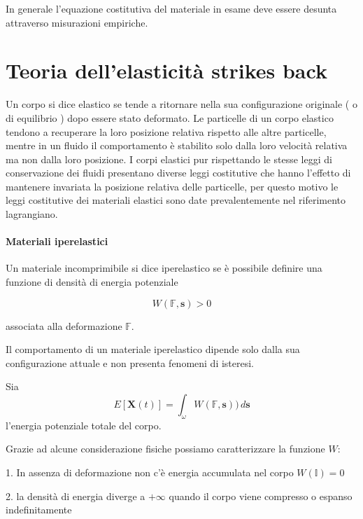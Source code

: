 In generale l'equazione costitutiva del materiale in esame deve essere desunta attraverso misurazioni empiriche.


\section{Teoria dell'elasticità strikes back}

Un corpo si dice elastico se tende a ritornare nella sua configurazione originale ( o di equilibrio ) dopo essere stato deformato. Le particelle di un corpo elastico tendono a recuperare la loro posizione relativa rispetto alle altre particelle, mentre in un fluido il comportamento è stabilito solo dalla loro velocità relativa ma non dalla loro posizione. I corpi elastici pur rispettando le stesse leggi di conservazione dei fluidi presentano diverse leggi costitutive che hanno l'effetto di mantenere invariata la posizione relativa delle particelle, per questo motivo le leggi costitutive dei materiali elastici sono date prevalentemente nel riferimento lagrangiano.

\paragraph{Materiali iperelastici}

Un materiale incomprimibile si dice iperelastico se è possibile definire una funzione di densità di energia potenziale

\begin{equation*}
W(\mathbb{F},\mathbf{s}) > 0
\end{equation*}

associata alla deformazione $\mathbb{F}$.

Il comportamento di un materiale iperelastico dipende solo dalla sua configurazione attuale e non presenta fenomeni di isteresi.

Sia 
\begin{equation*}
E [  \mathbf{X}(t) ] = \int_{\omega} W( \mathbb{F}, \mathbf{s} )) \, d\mathbf{s}
\end{equation*}
l'energia potenziale totale del corpo.

Grazie ad alcune considerazione fisiche possiamo caratterizzare la funzione $W$:

1. In assenza di deformazione non c'è energia accumulata nel corpo $W(\mathbb{I}) = 0$

2. la densità di energia diverge a $+\infty$ quando il corpo viene compresso o espanso indefinitamente  

